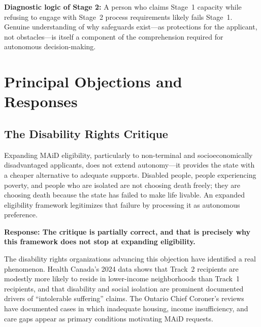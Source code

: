 \documentclass[11pt, letterpaper]{article}
\begin{document}
\begin{tcolorbox}[policybox]
\textbf{Diagnostic logic of Stage 2:} A person who claims Stage~1 capacity while refusing
to engage with Stage~2 process requirements likely fails Stage~1. Genuine understanding of
why safeguards exist---as protections for the applicant, not obstacles---is itself a
component of the comprehension required for autonomous decision-making.
\end{tcolorbox}

\newpage

\section{Principal Objections and Responses}

\subsection{The Disability Rights Critique}

\begin{tcolorbox}[warningbox, title={\sffamily\bfseries\small\color{warningborder}
  Objection — DAWN Canada, ADAPT, and related organizations}]
Expanding MAiD eligibility, particularly to non-terminal and socioeconomically disadvantaged
applicants, does not extend autonomy---it provides the state with a cheaper alternative to
adequate supports. Disabled people, people experiencing poverty, and people who are isolated
are not choosing death freely; they are choosing death because the state has failed to make
life livable. An expanded eligibility framework legitimizes that failure by processing it
as autonomous preference.
\end{tcolorbox}

\medskip
\noindent\textbf{Response: The critique is partially correct, and that is precisely why this
framework does not stop at expanding eligibility.}

The disability rights organizations advancing this objection have identified a real phenomenon.
Health Canada's 2024 data shows that Track~2 recipients are modestly more likely to reside
in lower-income neighborhoods than Track~1 recipients, and that disability and social isolation
are prominent documented drivers of ``intolerable suffering'' claims. The Ontario Chief
Coroner's reviews have documented cases in which inadequate housing, income insufficiency, and
care gaps appear as primary conditions motivating MAiD requests.
\end{document}
